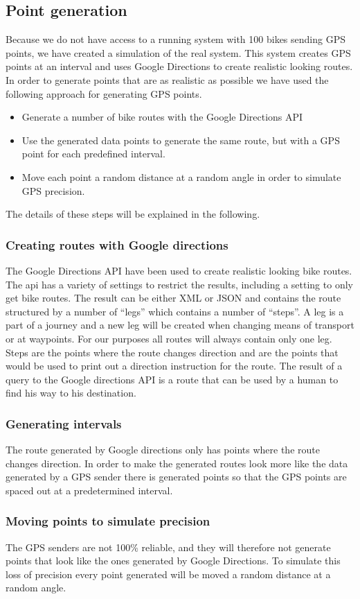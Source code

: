 \subsection{Point generation}
Because we do not have access to a running system with 100 bikes sending GPS points, we have created a simulation of the real system.
This system creates GPS points at an interval and uses Google Directions to create realistic looking routes.
In order to generate points that are as realistic as possible we have used the following approach for generating GPS points.

\begin{itemize}
\item Generate a number of bike routes with the Google Directions API
\item Use the generated data points to generate the same route, but with a GPS point for each predefined interval.
\item Move each point a random distance at a random angle in order to simulate GPS precision.
\end{itemize}

The details of these steps will be explained in the following.

\subsubsection{Creating routes with Google directions}

The Google Directions API \cite{gdirections} have been used to create realistic looking bike routes.
The api has a variety of settings to restrict the results, including a setting to only get bike routes.
The result can be either XML or JSON and contains the route structured by a number of  ``legs'' which contains a number of ``steps''.
A leg is a part of a journey and a new leg will be created when changing means of transport or at waypoints.
For our purposes all routes will always contain only one leg.
Steps are the points where the route changes direction and are the points that would be used to print out a direction instruction for the route.
The result of a query to the Google directions API is a route that can be used by a human to find his way to his destination.

\subsubsection{Generating intervals}
The route generated by Google directions only has points where the route changes direction.
In order to make the generated routes look more like the data generated by a GPS sender there is generated points so that the GPS points are spaced out at a predetermined interval.

\subsubsection{Moving points to simulate precision}
The GPS senders are not 100\% reliable, and they will therefore not generate points that look like the ones generated by Google Directions.
To simulate this loss of precision every point generated will be moved a random distance at a random angle.
